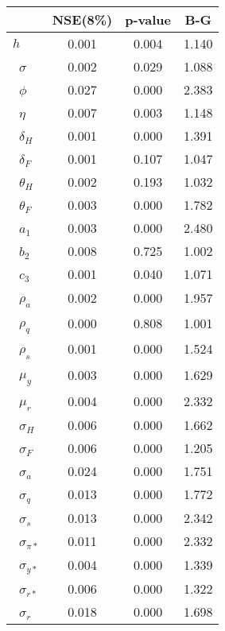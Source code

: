 \begin{tiny}\begin{tabular}{lccc}
\hline
&\textbf{NSE(8\%)}&\textbf{p-value}&\textbf{B-G}\\\hline
\textbf{$ h             $}&0.001&0.004&1.140\\\
\textbf{$ \sigma        $}&0.002&0.029&1.088\\\
\textbf{$ \phi          $}&0.027&0.000&2.383\\\
\textbf{$ \eta          $}&0.007&0.003&1.148\\\
\textbf{$ \delta_{H}    $}&0.001&0.000&1.391\\\
\textbf{$ \delta_{F}    $}&0.001&0.107&1.047\\\
\textbf{$ \theta_{H}    $}&0.002&0.193&1.032\\\
\textbf{$ \theta_{F}    $}&0.003&0.000&1.782\\\
\textbf{$ a_{1}         $}&0.003&0.000&2.480\\\
\textbf{$ b_{2}         $}&0.008&0.725&1.002\\\
\textbf{$ c_{3}         $}&0.001&0.040&1.071\\\
\textbf{$ \rho_{a}      $}&0.002&0.000&1.957\\\
\textbf{$ \rho_{q}      $}&0.000&0.808&1.001\\\
\textbf{$ \rho_{s}      $}&0.001&0.000&1.524\\\
\textbf{$ \mu_{y}       $}&0.003&0.000&1.629\\\
\textbf{$ \mu_{r}       $}&0.004&0.000&2.332\\\
\textbf{$ \sigma_{H}    $}&0.006&0.000&1.662\\\
\textbf{$ \sigma_{F}    $}&0.006&0.000&1.205\\\
\textbf{$ \sigma_{a}    $}&0.024&0.000&1.751\\\
\textbf{$ \sigma_{q}    $}&0.013&0.000&1.772\\\
\textbf{$ \sigma_{s}    $}&0.013&0.000&2.342\\\
\textbf{$ \sigma_{\pi*} $}&0.011&0.000&2.332\\\
\textbf{$ \sigma_{y*}   $}&0.004&0.000&1.339\\\
\textbf{$ \sigma_{r*}   $}&0.006&0.000&1.322\\\
\textbf{$ \sigma_{r}    $}&0.018&0.000&1.698\\\hline
\end{tabular}
\end{tiny}